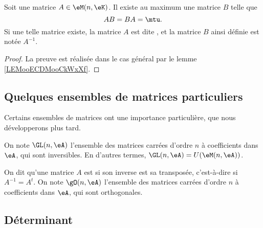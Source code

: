 \begin{propositionDef}
    Soit une matrice \( A\in \eM(n,\eK)\). Il existe au maximum une matrice \( B\) telle que
    \begin{equation}
        AB=BA=\mtu.
    \end{equation}
    Si une telle matrice existe, la matrice \( A\) est dite , et la matrice \( B\) ainsi définie est notée \( A^{-1}\).
\end{propositionDef}

\begin{proof}
La preuve est réalisée dans le cas général par le lemme \ref{LEMooECDMooCkWxXf}.
\end{proof}

\subsection{Quelques ensembles de matrices particuliers}
Certains ensembles de matrices ont une importance particulière, que nous développerons plus tard.

\begin{definition}
On note \( \GL(n,\eA) \) l'ensemble des matrices carrées d'ordre \( n \) à coefficients dans \( \eA \), qui sont inversibles. En d'autres termes, \( \GL(n,\eA) = U (\eM (n,\eA) ) \).
\end{definition}

\begin{definition}\label{DefMatriceOrthogonale}
On dit qu'une matrice \( A \) est  si son inverse est sa transposée, c'est-à-dire si \( A^{-1} = A^t \). On note \( \gO(n,\eA) \) l'ensemble des matrices carrées d'ordre \( n \) à coefficients dans \( \eA \), qui sont orthogonales.
\end{definition}

\subsection{Déterminant}

